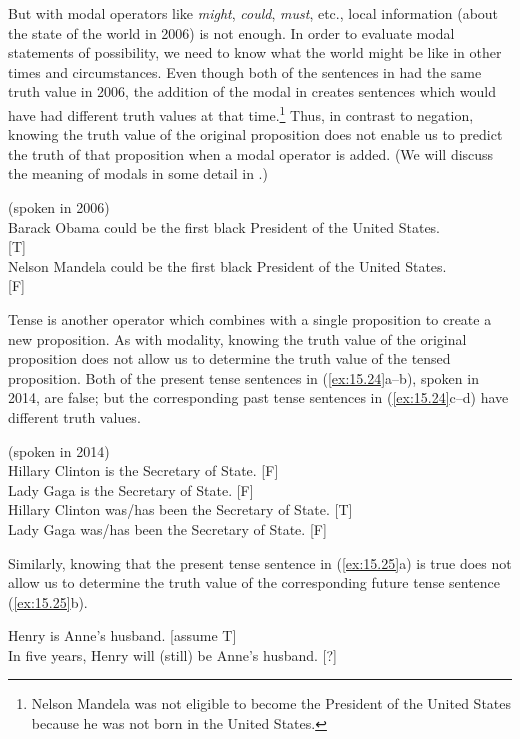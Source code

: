 But with modal operators like \textit{might}, \textit{could}, \textit{must}, etc., local information (about the state of the world in 2006) is not enough. In order to evaluate modal statements of possibility, we need to know what the world might be like in other times and circumstances. Even though both of the sentences in  had the same truth value in 2006, the addition of the modal in  creates sentences which would have had different truth values at that time.\footnote{Nelson Mandela was not eligible to become the President of the United States because he was not born in the United States.} Thus, in contrast to negation, knowing the truth value of the original proposition does not enable us to predict the truth of that proposition when a modal operator is added.   (We will discuss the meaning of modals in some detail in .)


\ea \label{ex:15.23}
(spoken in 2006)\\
\ea  Barack Obama could be the first black President of the United States.  \\ \hfill  [T]\\
\ex Nelson Mandela could be the first black President of the United States.  \\ \hfill [F]
                       \z
\z


Tense is another operator which combines with a single proposition to create a new proposition. As with modality, knowing the truth value of the original proposition does not allow us to determine the truth value of the tensed proposition. Both of the present tense sentences in (\ref{ex:15.24}a--b), spoken in 2014, are false; but the corresponding past tense sentences in (\ref{ex:15.24}c--d) have different truth values.


\ea \label{ex:15.24}
(spoken in 2014)\\
\ea  Hillary Clinton is the Secretary of State. \hfill  [F]\\
\ex Lady Gaga is the Secretary of State. \hfill  [F]\\
\ex Hillary Clinton was/has been the Secretary of State. \hfill  [T]\\
\ex Lady Gaga was/has been the Secretary of State. \hfill  [F]
                       \z
\z


Similarly, knowing that the present tense sentence in (\ref{ex:15.25}a) is true does not allow us to determine the truth value of the corresponding future tense sentence (\ref{ex:15.25}b).


\ea \label{ex:15.25}
\ea  Henry is Anne’s husband. \hfill [assume T]\\
\ex In five years, Henry will (still) be Anne’s husband.  \hfill [?]
                       \z
\z


